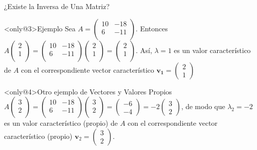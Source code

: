 \begin{frame}{¿Existe la Inversa de Una Matriz?}
\begin{exampleblock}<only@3>{Ejemplo}\justifying
  Sea $A =
  \begin{pmatrix}
    10 & -18 \\
    6 & -11 \\
  \end{pmatrix}
$. Entonces $A
\begin{pmatrix}
  2\\
  1\\
\end{pmatrix}
=
\begin{pmatrix}
    10 & -18 \\
    6 & -11 \\
  \end{pmatrix}
  \begin{pmatrix}
  2\\
  1\\
\end{pmatrix}
=
  \begin{pmatrix}
  2\\
  1\\
\end{pmatrix}
$. Así, $\lambda = 1$ es un valor característico de $A$ con el correspondiente vector característico $\bm{v_1} =
\begin{pmatrix}
  2\\
  1
\end{pmatrix}
$
\end{exampleblock}
\begin{exampleblock}<only@4>{Otro ejemplo de Vectores y Valores Propios} \justifying
  $A
\begin{pmatrix}
  3\\
  2\\
\end{pmatrix}
=
\begin{pmatrix}
    10 & -18 \\
    6 & -11 \\
  \end{pmatrix}
  \begin{pmatrix}
  3\\
  2\\
\end{pmatrix}
=
  \begin{pmatrix}
  -6\\
  -4
\end{pmatrix}
= -2
  \begin{pmatrix}
  3\\
  2
\end{pmatrix}
$, de modo que $\lambda_2 = -2$ es un valor característico (propio) de $A$ con el correspondiente vector característico (propio) $\bm{v}_2 =
\begin{pmatrix}
  3\\
  2
\end{pmatrix}
$.
\end{exampleblock}
\end{frame}


